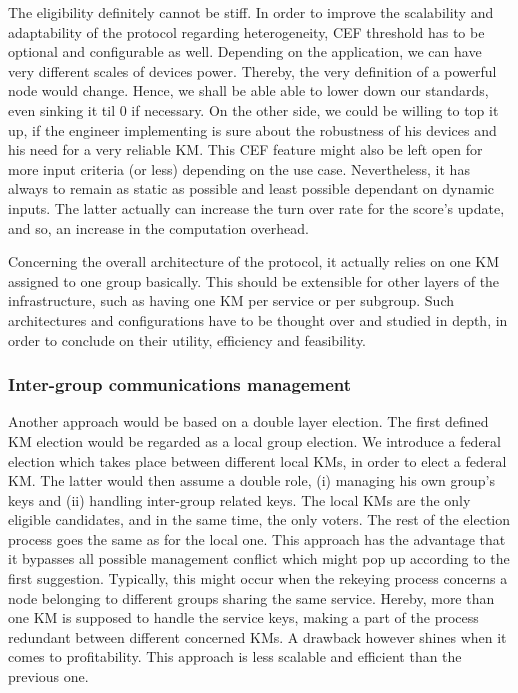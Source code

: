 The eligibility definitely cannot be stiff. In order to improve the scalability and adaptability of the protocol regarding heterogeneity, CEF threshold has to be optional and configurable as well. Depending on the application, we can have very different scales of devices power. Thereby, the very definition of a powerful node would change. Hence, we shall be able able to lower down our standards, even sinking it til 0 if necessary. On the other side, we could be willing to top it up, if the engineer implementing is sure about the robustness of his devices and his need for a very reliable KM. This CEF feature might also be left open for more input criteria (or less) depending on the use case. Nevertheless, it has always to remain as static as possible and least possible dependant on dynamic inputs. The latter actually can increase the turn over rate for the score’s update, and so, an increase in the computation overhead.

Concerning the overall architecture of the protocol, it actually relies on one KM assigned to one group basically. This should be extensible for other layers of the infrastructure, such as having one KM per service or per subgroup. Such architectures and configurations have to be thought over and studied in depth, in order to conclude on their utility, efficiency and feasibility.

\subsubsection{Inter-group communications management}

Another approach would be based on a double layer election. The first defined KM election would be regarded as a local group election. We introduce a federal election which takes place between different local KMs, in order to elect a federal KM. The latter would then assume a double role, (i) managing his own group’s keys and (ii) handling inter-group related keys. The local KMs are the only eligible candidates, and in the same time, the only voters. The rest of the election process goes the same as for the local one. This approach has the advantage that it bypasses all possible management conflict which might pop up according to the first suggestion. Typically, this might occur when the rekeying process concerns a node belonging to different groups sharing the same service. Hereby, more than one KM is supposed to handle the service keys, making a part of the process redundant between different concerned KMs. A drawback however shines when it comes to profitability. This approach is less scalable and efficient than the previous one.

